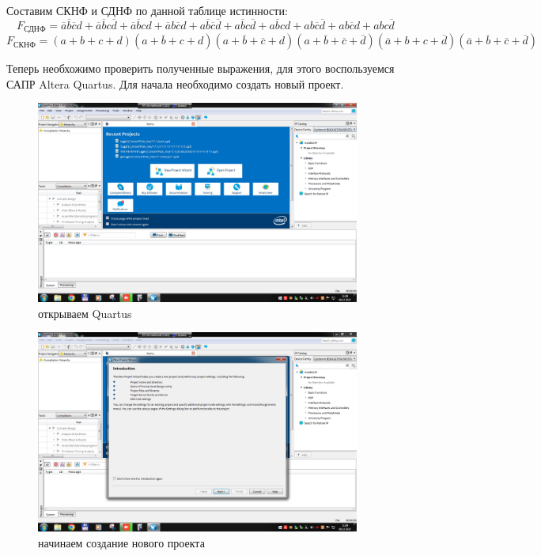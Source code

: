 \documentclass[a4paper]{article}
\begin{document}
  Составим СКНФ и СДНФ по данной таблице истинности:
  \begin{equation}
    F_{\text{СДНФ}} = \overline{a}\overline{b}\overline{c}d +
      \overline{a}\overline{b}c\overline{d} + \overline{a}\overline{b}cd +
      \overline{a}b\overline{c}d + a\overline{b}\overline{c}\overline{d} +
      a\overline{b}c\overline{d} + a\overline{b}cd + ab\overline{c}\overline{d} +
      ab\overline{c}d + abc\overline{d}
  \end{equation}
  \begin{equation}
    F_{\text{СКНФ}} = (a+b+c+d)(a+\overline{b}+c+d)
      (a+\overline{b}+\overline{c}+d)(a+\overline{b}+\overline{c}+\overline{d})
      (\overline{a}+b+c+\overline{d})(\overline{a} + \overline{b} + \overline{c} + \overline{d})
  \end{equation}

  Теперь необхожимо проверить полученные выражения, для этого воспользуемся САПР Altera Quartus.
  Для начала необходимо создать новый проект.

  \begin{figure}[H]
    \centering
    \includegraphics[width=0.95\textwidth]{02_01}
    \caption{открываем Quartus}
  \end{figure}

  \begin{figure}[H]
    \centering
    \includegraphics[width=0.95\textwidth]{02_02}
    \caption{начинаем создание нового проекта}
  \end{figure}
\end{document}
